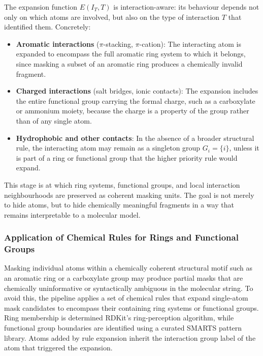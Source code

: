 \documentclass[a4paper,12pt]{article}
\begin{document}
The expansion function $E(I_T, T)$ is interaction-aware: its behaviour depends
not only on which atoms are involved, but also on the type of interaction
$T$ that identified them. Concretely:

\begin{itemize}
    \item \textbf{Aromatic interactions} ($\pi$-stacking, $\pi$-cation): The 
    interacting atom is expanded to encompass the full aromatic ring system to
    which it belongs, since masking a subset of an aromatic ring produces a
    chemically invalid fragment.

    \item \textbf{Charged interactions} (salt bridges, ionic contacts): The
    expansion includes the entire functional group carrying the formal charge,
    such as a carboxylate or ammonium moiety, because the charge is a property
    of the group rather than of any single atom.

    \item \textbf{Hydrophobic and other contacts}: In the absence of a broader
    structural rule, the interacting atom may remain as a singleton group
    $G_i = \{i\}$, unless it is part of a ring or functional group that the 
    higher priority rule would expand.
\end{itemize}

This stage is at which ring systems, functional groups, and local
interaction neighbourhoods are preserved as coherent masking units. The goal is
not merely to hide atoms, but to hide chemically meaningful fragments in
a way that remains interpretable to a molecular model.

\subsubsection{Application of Chemical Rules for Rings and Functional Groups}

Masking individual atoms within a chemically coherent structural motif such as an aromatic ring or a carboxylate group may produce partial masks that are chemically uninformative or syntactically ambiguous in the molecular string. To avoid this, the pipeline applies a set of chemical rules that expand single-atom mask candidates to encompass their containing ring systems or functional groups. Ring membership is determined  RDKit's ring-perception algorithm, while functional group boundaries are identified using a curated SMARTS pattern library. Atoms added by rule expansion inherit the interaction group label of the atom that triggered the expansion.
\end{document}
